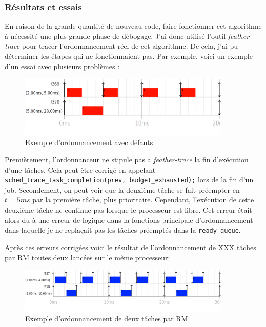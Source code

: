 \subsubsection{Résultats et essais}

En raison de la grande quantité de nouveau code, faire fonctionner cet algorithme à nécessité une plus grande phase de débogage. J'ai donc utilisé l'outil \textit{feather-trace} pour tracer l'ordonnancement réel de cet algorithme. De cela, j'ai pu déterminer les étapes qui ne fonctionnaient pas. Par exemple, voici un exemple d'un essai avec plusieurs problèmes : 
\begin{figure}[H]
    \centering
    \includegraphics[width=0.9\textwidth]{Images/schedule_host=rock960_scheduler=DEMO_trace=notstoped.png}
    \caption{Exemple d'ordonnancement avec défauts}
\end{figure}

Premièrement, l’ordonnanceur ne stipule pas a \textit{feather-trace} la fin d'exécution d'une tâches. Cela peut être corrigé en  appelant \texttt{sched\_trace\_task\_completion(prev, budget\_exhausted);} lors de la fin d'un job.
Secondement, on peut voir que la deuxième tâche se fait préempter en $t=5ms$ par la première tâche, plus prioritaire. Cependant, l'exécution de cette deuxième tâche ne continue pas lorsque le processeur est libre. Cet erreur était alors du à une erreur de logique dans la fonctions principale d’ordonnancement dans laquelle je ne replaçait pas les tâches préemptés dans la \texttt{ready\_queue}.

Après ces erreurs corrigées voici le résultat de l’ordonnancement de \color{red}XXX \color{black} tâches par RM toutes deux lancées sur le même processeur:

\begin{figure}[H]
    \centering
    \includegraphics[width=0.9\textwidth]{Images/RM-No-Offset.png}
    \caption{Exemple d'ordonnancement de deux tâches par RM}
    \label{fig:rm-schedualibility-demo}
\end{figure}


